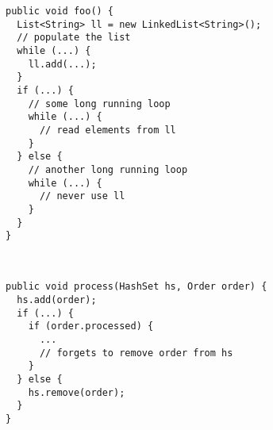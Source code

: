 \begin{figure}[p]
\lstset{frame=single}
\BC
\begin{minipage}{0.78\textwidth}
\begin{lstlisting}[title={(a) Object is reachable, but never accessed by
the application}]
public void foo() {
  List<String> ll = new LinkedList<String>();
  // populate the list
  while (...) {
    ll.add(...);
  }
  if (...) {
    // some long running loop
    while (...) {
      // read elements from ll
    }
  } else {
    // another long running loop
    while (...) {
      // never use ll
    }
  }
}
\end{lstlisting}
\end{minipage} \\[1ex]
\begin{minipage}{0.78\textwidth}
\begin{lstlisting}[title={(b) Failing to remove objects from a collection}]
public void process(HashSet hs, Order order) {
  hs.add(order);
  if (...) {
    if (order.processed) {
      ...
      // forgets to remove order from hs
    }
  } else {
    hs.remove(order);
  }
}
\end{lstlisting}
\end{minipage}
\EC
\lstset{frame=none}
\VspaceFixForHangcaption
\end{figure}
